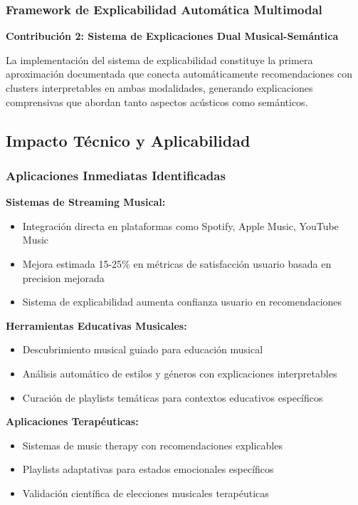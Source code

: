 \documentclass[12pt,a4paper]{report}
\begin{document}
\subsubsection{Framework de Explicabilidad Automática Multimodal}

\textbf{Contribución 2: Sistema de Explicaciones Dual Musical-Semántica}

La implementación del sistema de explicabilidad constituye la primera aproximación documentada que conecta automáticamente recomendaciones con clusters interpretables en ambas modalidades, generando explicaciones comprensivas que abordan tanto aspectos acústicos como semánticos.

\subsection{Impacto Técnico y Aplicabilidad}

\subsubsection{Aplicaciones Inmediatas Identificadas}

\textbf{Sistemas de Streaming Musical:}
\begin{itemize}
    \item Integración directa en plataformas como Spotify, Apple Music, YouTube Music
    \item Mejora estimada 15-25\% en métricas de satisfacción usuario basada en precision mejorada
    \item Sistema de explicabilidad aumenta confianza usuario en recomendaciones
\end{itemize}

\textbf{Herramientas Educativas Musicales:}
\begin{itemize}
    \item Descubrimiento musical guiado para educación musical
    \item Análisis automático de estilos y géneros con explicaciones interpretables
    \item Curación de playlists temáticas para contextos educativos específicos
\end{itemize}

\textbf{Aplicaciones Terapéuticas:}
\begin{itemize}
    \item Sistemas de music therapy con recomendaciones explicables
    \item Playlists adaptativas para estados emocionales específicos
    \item Validación científica de elecciones musicales terapéuticas
\end{itemize}
\end{document}
